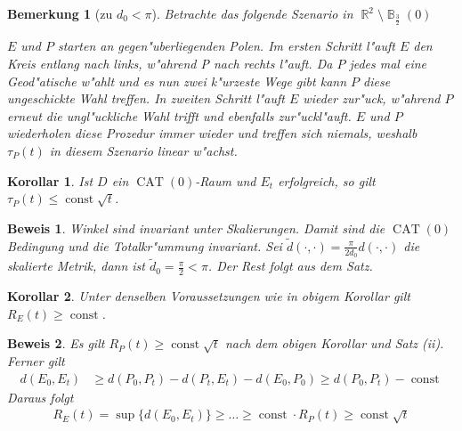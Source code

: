 \documentclass[paper=A4, twoside, chapterprefix=true, bibliography=totoc, headsepline]{scrbook}
\newcommand{\tikzgitter}[3][0.25]{ %
	\draw[step=#1,gray!15] #2 grid #3;
	\draw[step=2*#1,gray!30] #2 grid #3;
	\fill (0,0) circle(0.1); 
}
\DeclareMathOperator{\B}{\mathbb{B}} %
\DeclareMathOperator{\R}{\mathbb{R}}
\DeclareMathOperator{\const}{const} %
\DeclareMathOperator{\CAT}{CAT}
\theoremstyle{nonumberbreak}
\newtheorem{kor}{Korollar}
\newtheorem{bem}{Bemerkung}
\newtheorem{bew}{Beweis}
\theoremstyle{emptybreak}
\theoremstyle{break}
\begin{document}
\begin{bem}[zu $d_0 < \pi$]
Betrachte das folgende Szenario in $\R^2 \setminus \B_{\frac{3}{2}}(0)$
\begin{center}\end{center}
$E$ und $P$ starten an gegen"uberliegenden Polen.
Im ersten Schritt l"auft $E$ den Kreis entlang nach links, w"ahrend P nach rechts l"auft.
Da $P$ jedes mal eine Geod"atische w"ahlt und es nun zwei k"urzeste Wege gibt kann $P$ diese ungeschickte Wahl treffen.
In zweiten Schritt l"auft $E$ wieder zur"uck, w"ahrend $P$ erneut die ungl"uckliche Wahl trifft und ebenfalls zur"uckl"auft.
$E$ und $P$ wiederholen diese Prozedur immer wieder und treffen sich niemals, weshalb $\tau_P(t)$ in diesem Szenario linear w"achst.
\end{bem}

\begin{kor}
Ist $D$ ein $\CAT(0)$-Raum und $E_t$ erfolgreich, so gilt $\tau_P(t) \le \const \sqrt{t}$.
\end{kor}

\begin{bew}
Winkel sind invariant unter Skalierungen.
Damit  sind die $\CAT(0)$ Bedingung und die Totalkr"ummung invariant.
Sei $\tilde{d}(\cdot, \cdot) = \frac{\pi}{2 d_0} d(\cdot, \cdot)$ die skalierte Metrik, dann ist $\tilde{d}_0 = \frac{\pi}{2} < \pi$.
Der Rest folgt aus dem Satz.
\end{bew}

\begin{kor}
Unter denselben Voraussetzungen wie in obigem Korollar gilt $R_E(t) \ge \const$.
\end{kor}

\begin{bew}
Es gilt $R_P(t) \ge \const \sqrt{t}$ nach dem obigen Korollar und Satz (ii).
Ferner gilt
\begin{align*}
	d(E_0, E_t) &\ge d(P_0, P_t) - d(P_t, E_t) - d(E_0,P_0) \ge d(P_0, P_t) - \const
\end{align*}
Daraus folgt
\begin{align*}
	R_E(t) = \sup \{ d(E_0, E_t) \} \ge \ldots \ge \const \cdot R_P(t) \ge \const \sqrt t
\end{align*}
\end{bew}
\end{document}
